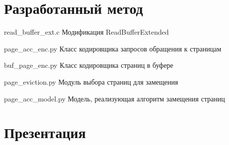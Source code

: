 \begin{appendices}
	\chapter{Разработанный метод}
	{read_buffer_ext.c} %
	{Модификация ReadBufferExtended} %

	{page_acc_enc.py} %
	{Класс кодировщика запросов обращения к страницам} %

	{buf_page_enc.py} %
	{Класс кодировщика страниц в буфере} %

	{page_eviction.py} %
	{Модуль выбора страниц для замещения} %

	{page_acc_model.py} %
	{Модель, реализующая алгоритм замещения страниц} %

	\chapter{Презентация}
\end{appendices}